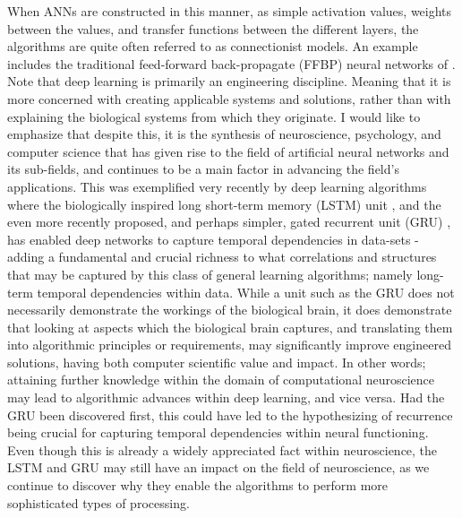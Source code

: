 When ANNs are constructed in this manner, as simple activation values, weights between the values, and transfer functions between the different layers, the algorithms are quite often referred to as connectionist models. An example includes the traditional feed-forward back-propagate (FFBP) neural networks of \citep{Rumelhart1986}.
Note that deep learning is primarily an engineering discipline. Meaning that it is more concerned with creating applicable systems and solutions, rather than with explaining the biological systems from which they originate. I would like to emphasize that despite this, it is the synthesis of neuroscience, psychology, and computer science that has given rise to the field of artificial neural networks and its sub-fields, and continues to be a main factor in advancing the field's applications. This was exemplified very recently by deep learning algorithms where the biologically inspired long short-term memory (LSTM) unit \citep{Hochreiter1997}, and the even more recently proposed, and perhaps simpler, gated recurrent unit (GRU) \citep{Mnih2015}, has enabled deep networks to capture temporal dependencies in data-sets - adding a fundamental and crucial richness to what correlations and structures that may be captured by this class of general learning algorithms; namely long-term temporal dependencies within data. While a unit such as the GRU does not necessarily demonstrate the workings of the biological brain, it does demonstrate that looking at aspects which the biological brain captures, and translating them into algorithmic principles or requirements, may significantly improve engineered solutions, having both computer scientific value and impact. In other words; attaining further knowledge within the domain of computational neuroscience may lead to algorithmic advances within deep learning, and vice versa. Had the GRU been discovered first, this could have led to the hypothesizing of recurrence being crucial for capturing temporal dependencies within neural functioning. Even though this is already a widely appreciated fact within neuroscience, the LSTM and GRU may still have an impact on the field of neuroscience, as we continue to discover why they enable the algorithms to perform more sophisticated types of processing.

